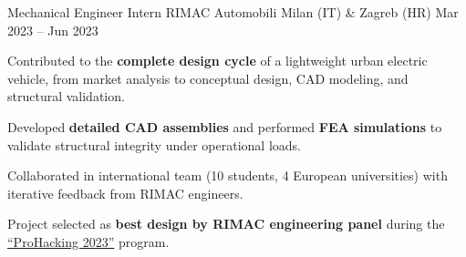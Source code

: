 
\cventry
{Mechanical Engineer Intern}
{RIMAC Automobili}
{Milan (IT) \& Zagreb (HR)}
{Mar 2023 -- Jun 2023}
{
    \begin{cvitems}
        \item {Contributed to the \textbf{complete design cycle} of a lightweight urban electric vehicle, from market analysis to conceptual design, CAD modeling, and structural validation.}
        \item {Developed \textbf{detailed CAD assemblies} and performed \textbf{FEA simulations} to validate structural integrity under operational loads.}
        \item {Collaborated in international team (10 students, 4 European universities) with iterative feedback from RIMAC engineers.}
        \item {Project selected as \textbf{best design by RIMAC engineering panel} during the \href{https://prohackin.eu/2023/05/16/conceptual-design-hackathon-held-at-rimac/}{``ProHacking 2023''} program.}
    \end{cvitems}
}


